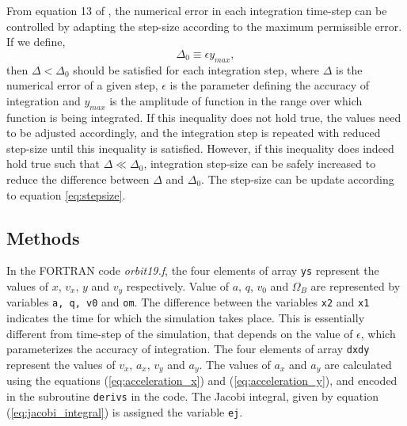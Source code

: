 \documentclass[a4paper]{article}
\begin{document}
	From equation 13 of \cite{lecture_3}, the numerical error in each integration time-step can be controlled by adapting the step-size according to the maximum permissible error. If we define,
	\begin{equation}
		\Delta_0 \equiv \epsilon y_{max},
		\label{eq:numerical_error}
	\end{equation}
	then \(\Delta < \Delta_0\) should be satisfied for each integration step, where \(\Delta\) is the numerical error of a given step, \(\epsilon\) is the parameter defining the accuracy of integration and \(y_{max}\) is the amplitude of function in the range over which function is being integrated. If this inequality does not hold true, the values need to be adjusted accordingly, and the integration step is repeated with reduced step-size until this inequality is satisfied. However, if this inequality does indeed hold true such that \(\Delta \ll \Delta_0\), integration step-size can be safely increased to reduce the difference between \(\Delta\) and \(\Delta_0\). The step-size can be update according to equation \ref{eq:stepsize}.
	 
	
		
		\subsection{Methods} \label{methods1}
			
		In the FORTRAN code \emph{orbit19.f}, the four elements of array \texttt{ys} represent the values of \(x\), \(v_x\), \(y\) and \(v_y\) respectively. Value of \(a\), \(q\), \(v_0\) and \(\Omega_B\) are represented by variables \texttt{a, q, v0} and \texttt{om}. The difference between the variables \texttt{x2} and \texttt{x1} indicates the time for which the simulation takes place. This is essentially different from time-step of the simulation, that depends on the value of \(\epsilon\), which parameterizes the accuracy of integration. The four elements of array \texttt{dxdy} represent the values of \(v_x\), \(a_x\), \(v_y\) and \(a_y\). The values of \(a_x\) and \(a_y\) are calculated using the equations (\ref{eq:acceleration_x}) and (\ref{eq:acceleration_y}), and encoded in the subroutine \texttt{derivs} in the code. The Jacobi integral, given by equation (\ref{eq:jacobi_integral}) is assigned the variable \texttt{ej}. \\
		
\end{document}
